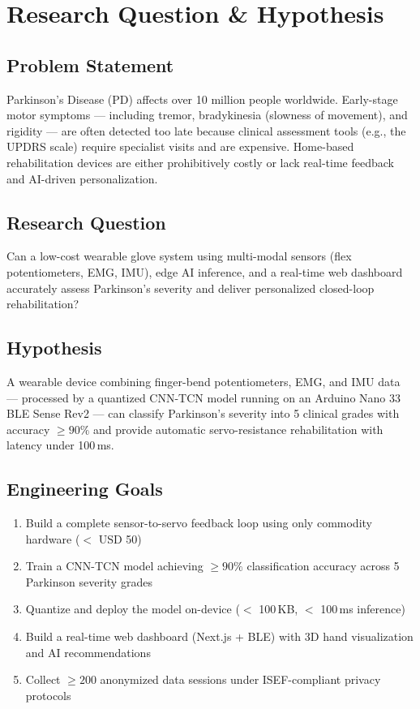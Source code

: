 \documentclass[12pt,a4paper]{article}
\begin{document}
\newpage

\section{Research Question \& Hypothesis}

\subsection{Problem Statement}
Parkinson's Disease (PD) affects over 10 million people worldwide. Early-stage motor symptoms --- including tremor, bradykinesia (slowness of movement), and rigidity --- are often detected too late because clinical assessment tools (e.g., the UPDRS scale) require specialist visits and are expensive. Home-based rehabilitation devices are either prohibitively costly or lack real-time feedback and AI-driven personalization.

\subsection{Research Question}
Can a low-cost wearable glove system using multi-modal sensors (flex potentiometers, EMG, IMU), edge AI inference, and a real-time web dashboard accurately assess Parkinson's severity and deliver personalized closed-loop rehabilitation?

\subsection{Hypothesis}
A wearable device combining finger-bend potentiometers, EMG, and IMU data --- processed by a quantized CNN-TCN model running on an Arduino Nano 33 BLE Sense Rev2 --- can classify Parkinson's severity into 5 clinical grades with accuracy $\geq 90\%$ and provide automatic servo-resistance rehabilitation with latency under 100\,ms.

\subsection{Engineering Goals}
\begin{enumerate}
  \item Build a complete sensor-to-servo feedback loop using only commodity hardware ($<$ USD 50)
  \item Train a CNN-TCN model achieving $\geq 90\%$ classification accuracy across 5 Parkinson severity grades
  \item Quantize and deploy the model on-device ($<$ 100\,KB, $<$ 100\,ms inference)
  \item Build a real-time web dashboard (Next.js + BLE) with 3D hand visualization and AI recommendations
  \item Collect $\geq 200$ anonymized data sessions under ISEF-compliant privacy protocols
\end{enumerate}
\end{document}
